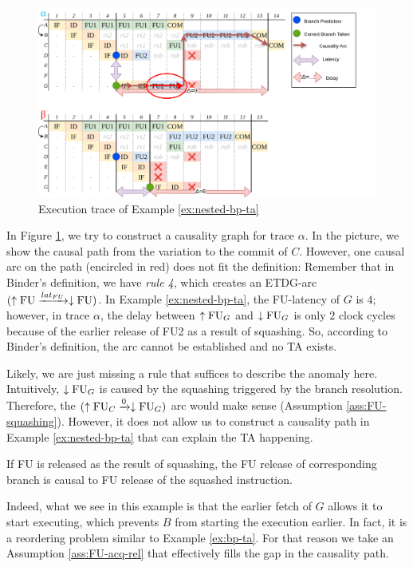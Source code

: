\begin{figure}
    \centering
    \includegraphics[width=\textwidth]{figures/nested-bp-ta.png}
    \caption{Execution trace of Example \ref{ex:nested-bp-ta}}
    \label{fig:nested-bp-ta-trace}
\end{figure}


In Figure \ref{fig:nested-bp-ta-trace}, we try to construct a causality graph for trace $\alpha$. In the picture, we show the causal path from the variation to the commit of $C$. However, one causal arc on the path (encircled in red) does not fit the definition: Remember that in Binder's definition, we have \textit{rule 4}, which creates an ETDG-arc $(\uparrow\mathrm{FU} \xrightarrow{lat_{FU}} \downarrow\mathrm{FU})$. In Example \ref{ex:nested-bp-ta}, the FU-latency of $G$ is $4$; however, in trace $\alpha$, the delay between $\uparrow\mathrm{FU}_G$ and $\downarrow\mathrm{FU}_G$ is only $2$ clock cycles because of the earlier release of FU2 as a result of squashing. So, according to Binder's definition, the arc cannot be established and no TA exists.

Likely, we are just missing a rule that suffices to describe the anomaly here. Intuitively, $\downarrow\mathrm{FU}_G$ is caused by the squashing triggered by the branch resolution. Therefore, the $(\uparrow\mathrm{FU}_C \xrightarrow{0} \downarrow\mathrm{FU}_G)$ arc would make sense (Assumption \ref{ass:FU-squashing}). However, it does not allow us to construct a causality path in Example \ref{ex:nested-bp-ta} that can explain the TA happening.

\begin{assumption}
If FU is released as the result of squashing, the FU release of corresponding branch is causal to FU release of the squashed instruction.
\label{ass:FU-squashing}
\end{assumption}

Indeed, what we see in this example is that the earlier fetch of $G$ allows it to start executing, which prevents $B$ from starting the execution earlier. In fact, it is a reordering problem similar to Example \ref{ex:bp-ta}. For that reason we take an Assumption \ref{ass:FU-acq-rel} that effectively fills the gap in the causality path.

